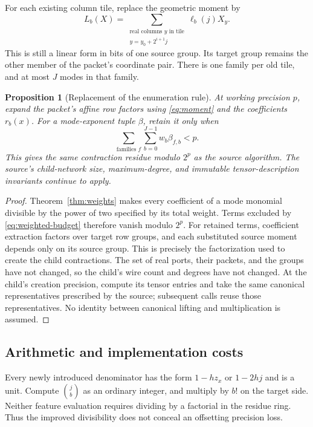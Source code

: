 \documentclass[11pt]{article}
\newtheorem{proposition}[theorem]{Proposition}
\theoremstyle{remark}
\begin{document}
For each existing column tile, replace the geometric moment by
\begin{equation}\label{eq:moment}
 L_b(X)=\sum_{\substack{\text{real columns }y\text{ in tile}\\y=y_0+2^{i+1}j}}
                         \ell_b(j)X_y.
\end{equation}
This is still a linear form in bits of one source group. Its target group remains the other member of the packet's coordinate pair. There is one family per old tile, and at most $J$ modes in that family.

\begin{proposition}[Replacement of the enumeration rule]\label{prop:recursion}
At working precision $p$, expand the packet's affine row factors using \eqref{eq:moment} and the coefficients $r_b(x)$. For a mode-exponent tuple $\beta$, retain it only when
\begin{equation}\label{eq:weighted-budget}
 \sum_{\text{families }f}\sum_{b=0}^{J-1}w_b\beta_{f,b}<p.
\end{equation}
This gives the same contraction residue modulo $2^p$ as the source algorithm. The source's child-network size, maximum-degree, and immutable tensor-description invariants continue to apply.
\end{proposition}

\begin{proof}
Theorem~\ref{thm:weights} makes every coefficient of a mode monomial divisible by the power of two specified by its total weight. Terms excluded by \eqref{eq:weighted-budget} therefore vanish modulo $2^p$. For retained terms, coefficient extraction factors over target row groups, and each substituted source moment depends only on its source group. This is precisely the factorization used to create the child contractions. The set of real ports, their packets, and the groups have not changed, so the child's wire count and degrees have not changed. At the child's creation precision, compute its tensor entries and take the same canonical representatives prescribed by the source; subsequent calls reuse those representatives. No identity between canonical lifting and multiplication is assumed.
\end{proof}

\subsection{Arithmetic and implementation costs}

Every newly introduced denominator has the form $1-hz_x$ or $1-2hj$ and is a unit. Compute $\binom jb$ as an ordinary integer, and multiply by $b!$ on the target side. Neither feature evaluation requires dividing by a factorial in the residue ring. Thus the improved divisibility does not conceal an offsetting precision loss.
\end{document}
